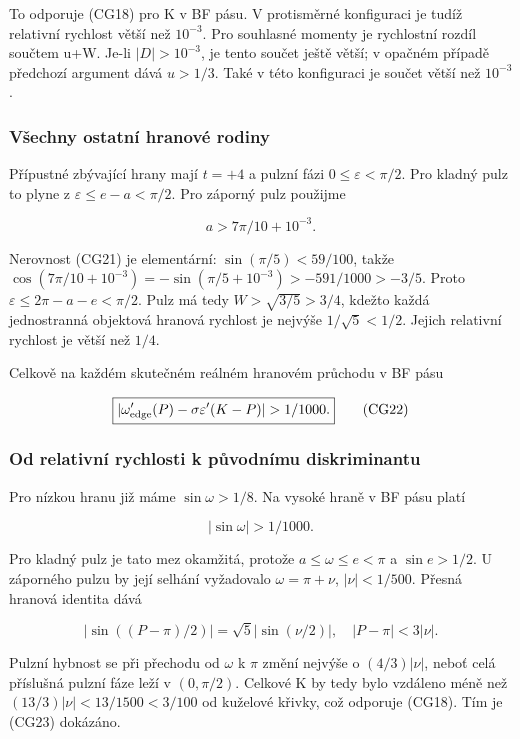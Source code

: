 \documentclass[11pt,a4paper]{article}
\theoremstyle{remark}\newtheorem{remark}[theorem]{Poznámka}
\numberwithin{equation}{section}
\begin{document}
To odporuje (CG18) pro K v BF pásu. V protisměrné konfiguraci je tudíž
relativní rychlost větší než \(10^{-3}\). Pro souhlasné momenty je
rychlostní rozdíl součtem u+W. Je-li \(|D|>10^{-3}\), je tento součet
ještě větší; v opačném případě předchozí argument dává \(u>1/3\). Také v
této konfiguraci je součet větší než \(10^{-3}\).

\hypertarget{vux161echny-ostatnuxed-hranovuxe9-rodiny}{%
\subsubsection{Všechny ostatní hranové
rodiny}\label{vux161echny-ostatnuxed-hranovuxe9-rodiny}}

Přípustné zbývající hrany mají \(t=+4\) a pulzní fázi
\(0\le\varepsilon<\pi/2\). Pro kladný pulz to plyne z
\(\varepsilon\le e-a<\pi/2\). Pro záporný pulz použijme

\[
a>7\pi/10+10^{-3}.
\tag{CG21}
\]

Nerovnost (CG21) je elementární: \(\sin(\pi/5)<59/100\), takže
\(\cos(7\pi/10+10^{-3})=-\sin(\pi/5+10^{-3})>-591/1000>-3/5\). Proto
\(\varepsilon\le2\pi-a-e<\pi/2\). Pulz má tedy \(W>\sqrt{3/5}>3/4\),
kdežto každá jednostranná objektová hranová rychlost je nejvýše
\(1/\sqrt5<1/2\). Jejich relativní rychlost je větší než \(1/4\).

Celkově na každém skutečném reálném hranovém průchodu v BF pásu

\[
\boxed{|\omega_{\rm edge}'(P)-\sigma\varepsilon'(K-P)|>1/1000.}
\tag{CG22}
\]

\hypertarget{od-relativnuxed-rychlosti-k-pux16fvodnuxedmu-diskriminantu}{%
\subsubsection{Od relativní rychlosti k původnímu
diskriminantu}\label{od-relativnuxed-rychlosti-k-pux16fvodnuxedmu-diskriminantu}}

Pro nízkou hranu již máme \(\sin\omega>1/8\). Na vysoké hraně v BF pásu
platí

\[
|\sin\omega|>1/1000.
\tag{CG23}
\]

Pro kladný pulz je tato mez okamžitá, protože \(a\le\omega\le e<\pi\) a
\(\sin e>1/2\). U záporného pulzu by její selhání vyžadovalo
\(\omega=\pi+\nu\), \(|\nu|<1/500\). Přesná hranová identita dává

\[
|\sin((P-\pi)/2)|=\sqrt5|\sin(\nu/2)|,
\quad |P-\pi|<3|\nu|.
\]

Pulzní hybnost se při přechodu od \(\omega\) k \(\pi\) změní nejvýše o
\((4/3)|\nu|\), neboť celá příslušná pulzní fáze leží v \((0,\pi/2)\).
Celkové K by tedy bylo vzdáleno méně než \((13/3)|\nu|<13/1500<3/100\)
od kuželové křivky, což odporuje (CG18). Tím je (CG23) dokázáno.
\end{document}
